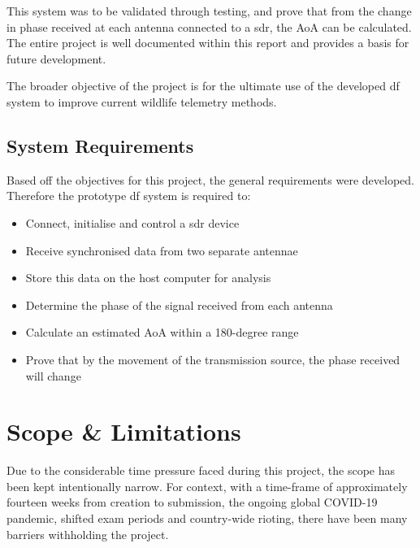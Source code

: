 \documentclass[class=report,11pt,crop=false]{standalone}
\begin{document}
This system was to be validated through testing, and prove that from the change in phase received at each antenna connected to a \gls{sdr}, the \gls{AoA} can be calculated. The entire project is well documented within this report and provides a basis for future development.

The broader objective of the project is for the ultimate use of the developed \gls{df} system to improve current wildlife telemetry methods. 

\subsection{System Requirements}
Based off the objectives for this project, the general requirements were developed. Therefore the prototype \gls{df} system is required to:

{
    \begin{itemize}
        \item{Connect, initialise and control a \gls{sdr} device}
    	\item{Receive synchronised data from two separate antennae}
    	\item{Store this data on the host computer for analysis}
    	\item{Determine the phase of the signal received from each antenna}
    	\item{Calculate an estimated \gls{AoA} within a 180-degree range}
    	\item{Prove that by the movement of the transmission source, the phase received will change}
    \end{itemize}
}





\section{Scope \& Limitations}
Due to the considerable time pressure faced during this project, the scope has been kept intentionally narrow. For context, with a time-frame of approximately fourteen weeks from creation to submission, the ongoing global COVID-19 pandemic, shifted exam periods and country-wide rioting, there have been many barriers withholding the project.
\end{document}
